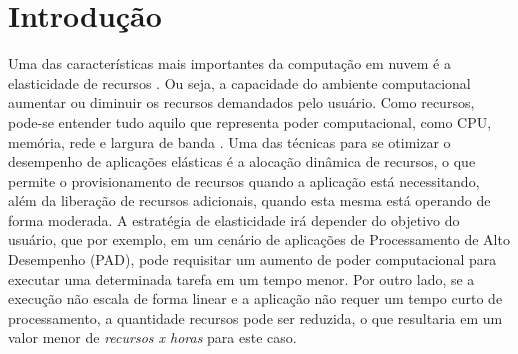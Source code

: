 \documentclass[twoside,english,brazilian]{UNISINOSartigo}
\begin{document}
%

%


\section{Introdução}

Uma das características mais importantes da computação em nuvem é a elasticidade de recursos \cite{Mell2012,Mauch20131408}. Ou seja, a capacidade do ambiente computacional aumentar ou diminuir os recursos demandados pelo usuário. Como recursos, pode-se entender tudo aquilo que representa poder computacional, como CPU, memória, rede e largura de banda \cite{Kominos2017}. Uma das técnicas para se otimizar o desempenho de aplicações elásticas é a alocação dinâmica de recursos, o que permite o provisionamento de recursos quando a aplicação está necessitando, além da liberação de recursos adicionais, quando esta mesma está operando de forma moderada. A estratégia de elasticidade irá depender do objetivo do usuário, que por exemplo, em um cenário de aplicações de Processamento de Alto Desempenho (PAD), pode requisitar um aumento de poder computacional para executar uma determinada tarefa em um tempo menor. Por outro lado, se a execução não escala de forma linear e a aplicação não requer um tempo curto de processamento, a quantidade recursos pode ser reduzida, o que resultaria em um valor menor de \textit{recursos x horas} para este caso.
\end{document}
